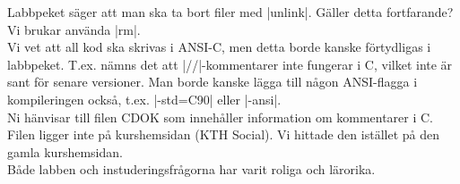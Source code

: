 \documentclass[paper=a4, fontsize=11pt]{scrartcl} %
\numberwithin{equation}{section} %
\numberwithin{figure}{section} %
\numberwithin{table}{section} %
\begin{document}
Labbpeket säger att man ska ta bort filer med |unlink|. Gäller detta fortfarande? Vi brukar använda |rm|.\\

Vi vet att all kod ska skrivas i ANSI-C, men detta borde kanske förtydligas i labbpeket. T.ex. nämns det att |//|-kommentarer inte fungerar i C, vilket inte är sant för senare versioner. Man borde kanske lägga till någon ANSI-flagga i kompileringen också, t.ex. |-std=C90| eller |-ansi|.\\

Ni hänvisar till filen CDOK som innehåller information om kommentarer i C. Filen ligger inte på kurshemsidan (KTH Social). Vi hittade den istället på den gamla kurshemsidan.\\

Både labben och instuderingsfrågorna har varit roliga och lärorika.
\end{document}
